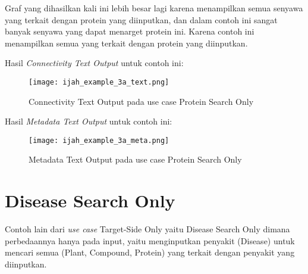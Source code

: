 Graf yang dihasilkan kali ini lebih besar lagi karena menampilkan semua senyawa yang terkait dengan protein yang diinputkan, dan dalam contoh ini sangat banyak senyawa yang dapat menarget protein ini. Karena contoh ini menampilkan semua yang terkait dengan protein yang diinputkan.

Hasil \emph{Connectivity Text Output} untuk contoh ini:

\begin{figure}[H]
	\centering
	\texttt{[image: ijah\_example\_3a\_text.png]}
	\caption{Connectivity Text Output pada use case Protein Search Only}
	\label{fig:ijah_example_3a_text}
\end{figure}

Hasil \emph{Metadata Text Output} untuk contoh ini:

\begin{figure}[H]
	\centering
	\texttt{[image: ijah\_example\_3a\_meta.png]}
	\caption{Metadata Text Output pada use case Protein Search Only}
	\label{fig:ijah_example_3a_meta}
\end{figure}

\section{Disease Search Only}
Contoh lain dari \emph{use case} Target-Side Only yaitu Disease Search Only dimana perbedaannya hanya pada input, yaitu menginputkan penyakit (Disease) untuk mencari semua (Plant, Compound, Protein) yang terkait dengan penyakit yang diinputkan.



